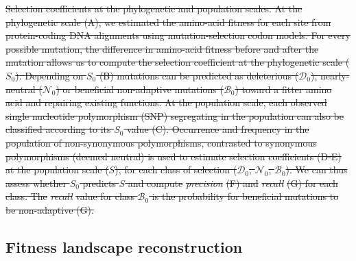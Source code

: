 \documentclass{article} %
\newcommand{\Sphy}{S_{0}}
\newcommand{\SphyDel}{\mathcal{D}_0}
\newcommand{\SphyNeu}{\mathcal{N}_0}
\newcommand{\SphyBen}{\mathcal{B}_0}
\newcommand{\Spop}{S}
\providecommand{\DIFdeltex}[1]{{\protect\color{red}\sout{#1}}}                      %
\providecommand{\DIFdelend}{} %
\providecommand{\DIFdelFL}[1]{\DIFdel{#1}} %
\providecommand{\DIFdel}[1]{\texorpdfstring{\DIFdeltex{#1}}{}} %
\DeclareRobustCommand{\DIFdelend}{\DIFOaddend \let\includegraphics\DIFOincludegraphics} %
\begin{document}
{%
\DIFdelFL{Selection coefficients at the phylogenetic and population scales.
              At the phylogenetic scale (A), we estimated the amino-acid fitness for each site from protein-coding DNA alignments using mutation-selection codon models.
              For every possible mutation, the difference in amino-acid fitness before and after the mutation allows us to compute the selection coefficient at the phylogenetic scale ($\Sphy$).
              Depending on $\Sphy$ (B) mutations can be predicted as deleterious ($\SphyDel$), nearly-neutral ($\SphyNeu$) or beneficial non-adaptive mutations ($\SphyBen$) toward a fitter amino acid and repairing existing functions.
              At the population scale, each observed single nucleotide polymorphism (SNP) segregating in the population can also be classified according to its $\Sphy$ value (C).
              Occurrence and frequency in the population of non-synonymous polymorphisms, contrasted to synonymous polymorphisms (deemed neutral) is used to estimate selection coefficients (D-E) at the population scale ($\Spop$), for each class of selection ($\SphyDel$, $\SphyNeu$, $\SphyBen$).
              We can thus assess whether $\Sphy$ predicts $\Spop$ and compute }\textit{\DIFdelFL{precision}} %
\DIFdelFL{(F) and }\textit{\DIFdelFL{recall}} %
\DIFdelFL{(G) for each class.
              The }\textit{\DIFdelFL{recall}} %
\DIFdelFL{value for class $\SphyBen$ is the probability for beneficial mutations to be non-adaptive (G).
       }}

\DIFdelend \subsection*{Fitness landscape reconstruction}
\end{document}
